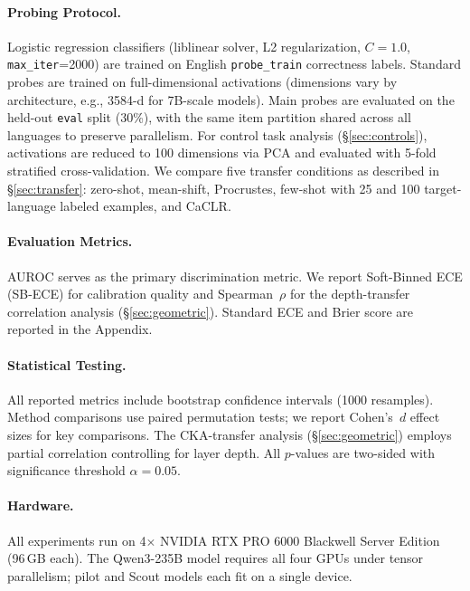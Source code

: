 \paragraph{Probing Protocol.} Logistic regression classifiers (liblinear solver, L2 regularization, $C{=}1.0$, \texttt{max\_iter}{=}2000) are trained on English \texttt{probe\_train} correctness labels. Standard probes are trained on full-dimensional activations (dimensions vary by architecture, e.g., 3584-d for 7B-scale models). Main probes are evaluated on the held-out \texttt{eval} split (30\%), with the same item partition shared across all languages to preserve parallelism. For control task analysis (\S\ref{sec:controls}), activations are reduced to 100 dimensions via PCA and evaluated with 5-fold stratified cross-validation. We compare five transfer conditions as described in \S\ref{sec:transfer}: zero-shot, mean-shift, Procrustes, few-shot with 25 and 100 target-language labeled examples, and CaCLR.

\paragraph{Evaluation Metrics.} AUROC serves as the primary discrimination metric. We report Soft-Binned ECE (SB-ECE) \citep{karandikar2021sbece} for calibration quality and Spearman~$\rho$ for the depth-transfer correlation analysis (\S\ref{sec:geometric}). Standard ECE and Brier score are reported in the Appendix.

\paragraph{Statistical Testing.} All reported metrics include bootstrap confidence intervals (1000 resamples). Method comparisons use paired permutation tests; we report Cohen's~$d$ effect sizes for key comparisons. The CKA-transfer analysis (\S\ref{sec:geometric}) employs partial correlation controlling for layer depth. All $p$-values are two-sided with significance threshold $\alpha{=}0.05$.

\paragraph{Hardware.} All experiments run on 4$\times$ NVIDIA RTX PRO 6000 Blackwell Server Edition (96\,GB each). The Qwen3-235B model requires all four GPUs under tensor parallelism; pilot and Scout models each fit on a single device. %


